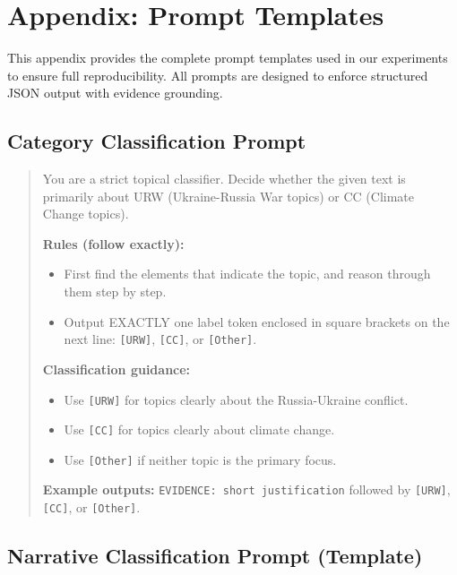 \section{Appendix: Prompt Templates}
\label{appendix:prompts}

This appendix provides the complete prompt templates used in our experiments to ensure full reproducibility. All prompts are designed to enforce structured JSON output with evidence grounding.

\subsection{Category Classification Prompt}

\begin{small}
\begin{quote}
You are a strict topical classifier. Decide whether the given text is primarily about URW (Ukraine-Russia War topics) or CC (Climate Change topics).

\textbf{Rules (follow exactly):}
\begin{itemize}
\item First find the elements that indicate the topic, and reason through them step by step.
\item Output EXACTLY one label token enclosed in square brackets on the next line: \texttt{[URW]}, \texttt{[CC]}, or \texttt{[Other]}.
\end{itemize}

\textbf{Classification guidance:}
\begin{itemize}
\item Use \texttt{[URW]} for topics clearly about the Russia-Ukraine conflict.
\item Use \texttt{[CC]} for topics clearly about climate change.
\item Use \texttt{[Other]} if neither topic is the primary focus.
\end{itemize}

\textbf{Example outputs:} \texttt{EVIDENCE: short justification} followed by \texttt{[URW]}, \texttt{[CC]}, or \texttt{[Other]}.
\end{quote}
\end{small}

\subsection{Narrative Classification Prompt (Template)}

